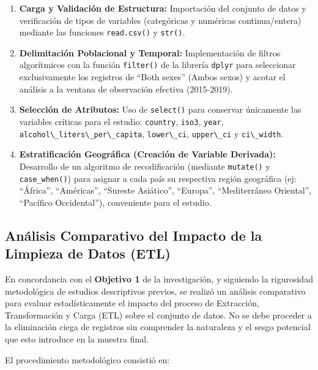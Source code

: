 \documentclass[oneside,11pt]{Latex/Classes/PhDthesisPSnPDF}
\providecommand{\tightlist}{%
  \setlength{\itemsep}{0pt}\setlength{\parskip}{0pt}}
\providecommand{\tightlist}{\setlength{\itemsep}{0pt}\setlength{\parskip}{0pt}}
\begin{document}
\begin{enumerate}
\def\labelenumi{\arabic{enumi}.}
\tightlist
\item
  \textbf{Carga y Validación de Estructura:} Importación del conjunto de
  datos y verificación de tipos de variables (categóricas y numéricas
  continua/entera) mediante las funciones \texttt{read.csv()} y
  \texttt{str()}.
\item
  \textbf{Delimitación Poblacional y Temporal:} Implementación de
  filtros algorítmicos con la función \texttt{filter()} de la librería
  \texttt{dplyr} para seleccionar exclusivamente los registros de ``Both
  sexes'' (Ambos sexos) y acotar el análisis a la ventana de observación
  efectiva (2015-2019).
\item
  \textbf{Selección de Atributos:} Uso de \texttt{select()} para
  conservar únicamente las variables críticas para el estudio:
  \texttt{country}, \texttt{iso3}, \texttt{year},
  \texttt{alcohol\textbackslash{}\_liters\textbackslash{}\_per\textbackslash{}\_capita},
  \texttt{lower\textbackslash{}\_ci}, \texttt{upper\textbackslash{}\_ci}
  y \texttt{ci\textbackslash{}\_width}.
\item
  \textbf{Estratificación Geográfica (Creación de Variable Derivada):}
  Desarrollo de un algoritmo de recodificación (mediante
  \texttt{mutate()} y \texttt{case\_when()}) para asignar a cada país su
  respectiva región geográfica (ej: ``África'', ``Américas'', ``Sureste
  Asiático'', ``Europa'', ``Mediterráneo Oriental'', ``Pacífico
  Occidental''), conveniente para el estudio.\\
\end{enumerate}

\subsection{Análisis Comparativo del Impacto de la Limpieza de Datos (ETL)}

En concordancia con el \textbf{Objetivo 1} de la investigación, y
siguiendo la rigurosidad metodológica de estudios descriptivos previos,
se realizó un análisis comparativo para evaluar estadísticamente el
impacto del proceso de Extracción, Transformación y Carga (ETL) sobre el
conjunto de datos. No se debe proceder a la eliminación ciega de
registros sin comprender la naturaleza y el sesgo potencial que esto
introduce en la muestra final.

El procedimiento metodológico consistió en:
\end{document}
